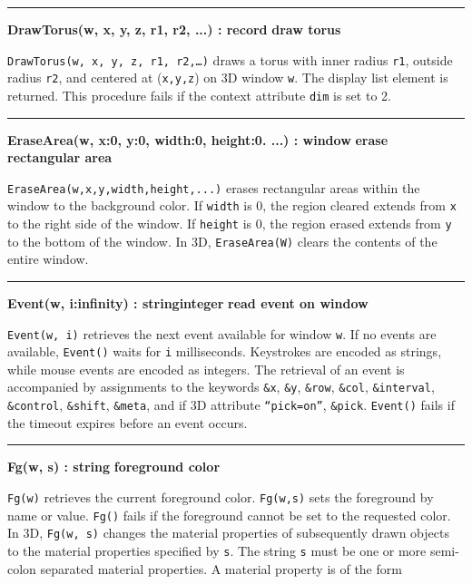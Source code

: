 \bigskip\hrule\vspace{0.1cm}
\noindent
{\bf DrawTorus(w, x, y, z, r1, r2, ...) : record } \hfill {\bf draw torus}

\noindent
\texttt{DrawTorus(w, x, y, z, r1, r2,{\dots})} draws a torus with
inner radius \texttt{r1}, outside radius \texttt{r2}, and centered at
(\texttt{x,y,z}) on 3D window \texttt{w}. The display list element is
returned. This procedure fails if the context attribute \texttt{dim} is
set to 2.

\bigskip\hrule\vspace{0.1cm}
\noindent
{\bf EraseArea(w, x:0, y:0, width:0, height:0. ...) : window } \hfill {\bf erase rectangular area}

\noindent
\texttt{EraseArea(w,x,y,width,height,...)} erases rectangular areas
within the window to the background color. If \texttt{width} is 0,
the region cleared extends from \texttt{x} to the right side of the
window. If \texttt{height} is 0, the region erased extends from
\texttt{y} to the bottom of the window. In 3D, \texttt{EraseArea(W)}
clears the contents of the entire window.

\bigskip\hrule\vspace{0.1cm}
\noindent
{\bf Event(w, i:infinity) : string{\textbar}integer } \hfill {\bf  read event on window}

\noindent
\texttt{Event(w, i)} retrieves the next event available for window
\texttt{w}. If no events are available, \texttt{Event()} waits for
\texttt{i} milliseconds. Keystrokes are encoded as strings, while mouse
events are encoded as integers. The retrieval of an event is
accompanied by assignments to the keywords \texttt{\&x}, \texttt{\&y},
\texttt{\&row}, \texttt{\&col}, \texttt{\&interval},
\texttt{\&control}, \texttt{\&shift}, \texttt{\&meta}, and if 3D
attribute \texttt{{\textquotedblleft}pick=on{\textquotedblright}},
\texttt{\&pick}. \texttt{Event()} fails if the timeout expires before
an event occurs.

\bigskip\hrule\vspace{0.1cm}
\noindent
{\bf Fg(w, s) : string } \hfill {\bf foreground color}

\noindent
\texttt{Fg(w)} retrieves the current foreground color. \texttt{Fg(w,s)}
sets the foreground by name or value. \texttt{Fg()} fails if the
foreground cannot be set to the requested color. In 3D,
\texttt{Fg(w, s)} changes the material properties of subsequently drawn objects
to the material properties specified by \texttt{s}. The string \texttt{s}
must be one or more semi-colon separated material properties. A
material property is of the form 

